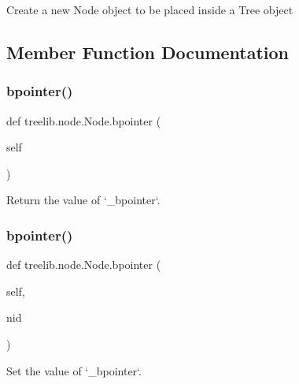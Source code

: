 \begin{DoxyVerb}Create a new Node object to be placed inside a Tree object\end{DoxyVerb}
 

\subsection{Member Function Documentation}
\mbox{\label{classtreelib_1_1node_1_1Node_a3def6abc955f79c98da7688fa6081bc9}} 
\subsubsection{\texorpdfstring{bpointer()}{bpointer()}\hspace{0.1cm}{\footnotesize\ttfamily [1/2]}}
{\footnotesize\ttfamily def treelib.\+node.\+Node.\+bpointer (\begin{DoxyParamCaption}\item[{}]{self }\end{DoxyParamCaption})}

\begin{DoxyVerb}Return the value of `_bpointer`.\end{DoxyVerb}
 \mbox{\label{classtreelib_1_1node_1_1Node_aaedc8fc3db46b17bb479cb69ad66608d}} 
\subsubsection{\texorpdfstring{bpointer()}{bpointer()}\hspace{0.1cm}{\footnotesize\ttfamily [2/2]}}
{\footnotesize\ttfamily def treelib.\+node.\+Node.\+bpointer (\begin{DoxyParamCaption}\item[{}]{self,  }\item[{}]{nid }\end{DoxyParamCaption})}

\begin{DoxyVerb}Set the value of `_bpointer`.\end{DoxyVerb}
 \mbox{\label{classtreelib_1_1node_1_1Node_ad2b9f57da01153752895e27d5d2c144e}} 
